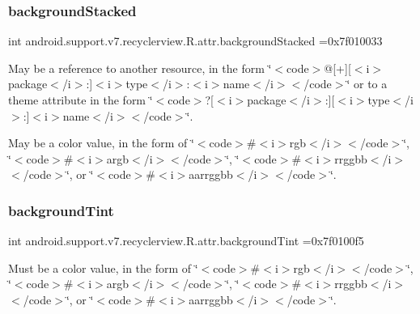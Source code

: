 \subsubsection{\texorpdfstring{background\+Stacked}{backgroundStacked}}
{\footnotesize\ttfamily int android.\+support.\+v7.\+recyclerview.\+R.\+attr.\+background\+Stacked =0x7f010033\hspace{0.3cm}{\ttfamily [static]}}

May be a reference to another resource, in the form \char`\"{}$<$code$>$@\mbox{[}+\mbox{]}\mbox{[}$<$i$>$package$<$/i$>$\+:\mbox{]}$<$i$>$type$<$/i$>$\+:$<$i$>$name$<$/i$>$$<$/code$>$\char`\"{} or to a theme attribute in the form \char`\"{}$<$code$>$?\mbox{[}$<$i$>$package$<$/i$>$\+:\mbox{]}\mbox{[}$<$i$>$type$<$/i$>$\+:\mbox{]}$<$i$>$name$<$/i$>$$<$/code$>$\char`\"{}. 

May be a color value, in the form of \char`\"{}$<$code$>$\#$<$i$>$rgb$<$/i$>$$<$/code$>$\char`\"{}, \char`\"{}$<$code$>$\#$<$i$>$argb$<$/i$>$$<$/code$>$\char`\"{}, \char`\"{}$<$code$>$\#$<$i$>$rrggbb$<$/i$>$$<$/code$>$\char`\"{}, or \char`\"{}$<$code$>$\#$<$i$>$aarrggbb$<$/i$>$$<$/code$>$\char`\"{}. \mbox{\label{classandroid_1_1support_1_1v7_1_1recyclerview_1_1R_1_1attr_a01811a5002518de747605636d2227be3}} 
\subsubsection{\texorpdfstring{background\+Tint}{backgroundTint}}
{\footnotesize\ttfamily int android.\+support.\+v7.\+recyclerview.\+R.\+attr.\+background\+Tint =0x7f0100f5\hspace{0.3cm}{\ttfamily [static]}}

Must be a color value, in the form of \char`\"{}$<$code$>$\#$<$i$>$rgb$<$/i$>$$<$/code$>$\char`\"{}, \char`\"{}$<$code$>$\#$<$i$>$argb$<$/i$>$$<$/code$>$\char`\"{}, \char`\"{}$<$code$>$\#$<$i$>$rrggbb$<$/i$>$$<$/code$>$\char`\"{}, or \char`\"{}$<$code$>$\#$<$i$>$aarrggbb$<$/i$>$$<$/code$>$\char`\"{}. 

